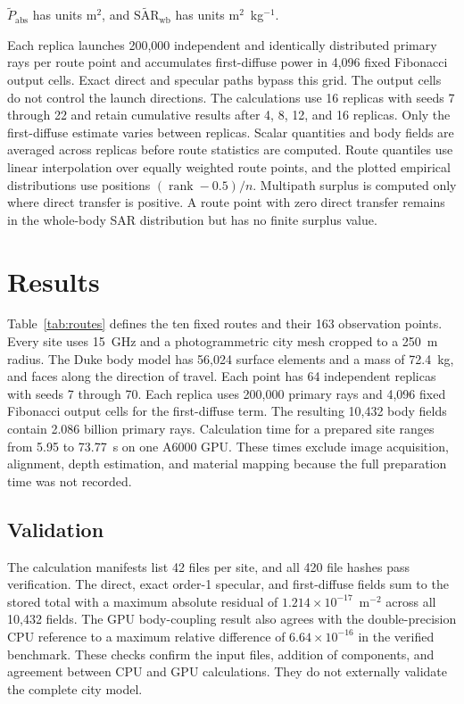 \documentclass{ieeeaccess}
\begin{document}
$\widetilde{P}_{\mathrm{abs}}$ has units m$^2$, and $\widetilde{\mathrm{SAR}}_{\mathrm{wb}}$ has units m$^2$~kg$^{-1}$.

Each replica launches 200,000 independent and identically distributed primary
rays per route point and accumulates first-diffuse power in 4,096 fixed
Fibonacci output cells. Exact direct and specular paths bypass this grid. The output cells do not control the launch directions.
The calculations use 16 replicas with seeds 7 through 22 and retain cumulative
results after 4, 8, 12, and 16 replicas. Only the first-diffuse estimate varies
between replicas. Scalar quantities and body fields are averaged across replicas
before route statistics are computed. Route quantiles use linear interpolation
over equally weighted route points, and the plotted empirical distributions use
positions $(\operatorname{rank}-0.5)/n$. Multipath surplus is computed
only where direct transfer is positive. A route point with zero direct transfer
remains in the whole-body SAR distribution but has no finite surplus value.

\section{Results}
\label{sec:results}

Table~\ref{tab:routes} defines the ten fixed routes and their 163 observation
points. Every site uses 15~GHz and a photogrammetric city mesh cropped to a
250~m radius. The Duke body model has 56,024 surface elements and a mass of
72.4~kg, and faces along the direction of travel. Each point has 64 independent
replicas with seeds 7 through 70. Each replica uses 200,000 primary rays and
4,096 fixed Fibonacci output cells for the first-diffuse term. The resulting
10,432 body fields contain 2.086 billion primary rays.
Calculation time for a prepared site ranges from 5.95 to 73.77~s on one A6000
GPU. These times exclude image acquisition, alignment, depth estimation, and
material mapping because the full preparation time was not recorded.

\subsection{Validation}
\label{sec:validation}

The calculation manifests list 42 files per site, and all 420 file hashes pass
verification. The direct, exact order-1 specular, and first-diffuse fields sum
to the stored total with a maximum absolute residual of
$1.214\times10^{-17}$~m$^{-2}$ across all 10,432 fields. The GPU body-coupling
result also agrees with the double-precision CPU reference to a maximum relative
difference of $6.64\times10^{-16}$ in the verified benchmark. These checks
confirm the input files, addition of components, and agreement between CPU and
GPU calculations. They do not externally validate the complete city model.
\end{document}
